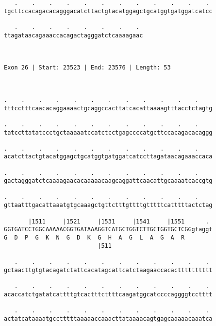 \documentclass{article}
\begin{document}
\begin{Verbatim}
   .    .    .    .    .    .    .    .    .    .    .    . 
tgcttccacagacacagggacatcttactgtacatggagctgcatggtgatggatcatcc
                                                            
   .    .    .    .    .    .    .    . 
ttagataacagaaaccacagactagggatctcaaaagaac
                                        
                                        
 
Exon 26 | Start: 23523 | End: 23576 | Length: 53



.    .    .    .    .    .    .    .    .    .    .    .    
tttcctttcaacacaggaaaactgcaggccacttatcacattaaaagtttacctctagtg
                                                            
.    .    .    .    .    .    .    .    .    .    .    .    
tatccttatatccctgctaaaaatccatctcctgagccccatgcttccacagacacaggg
                                                            
.    .    .    .    .    .    .    .    .    .    .    .    
acatcttactgtacatggagctgcatggtgatggatcatccttagataacagaaaccaca
                                                            
.    .    .    .    .    .    .    .    .    .    .    .    
gactagggatctcaaaagaacacaaaaacaagcaggattcaacattgcaaaatcaccgtg
                                                            
.    .    .    .    .    .    .    .    .    .    .    .    
gttaatttgacattaaatgtgcaaagctgttctttgttttgtttttcatttttactctag
                                                            
       |1511     |1521     |1531     |1541     |1551      . 
GGTGATCCTGGCAAAAACGGTGATAAAGGTCATGCTGGTCTTGCTGGTGCTCGGgtaggt
G  D  P  G  K  N  G  D  K  G  H  A  G  L  A  G  A  R        
                           |511                             
  
   .    .    .    .    .    .    .    .    .    .    .    . 
gctaacttgtgtacagatctattcacatagcattcatctaagaaccacactttttttttt
                                                            
   .    .    .    .    .    .    .    .    .    .    .    . 
acaccatctgatatcattttgtcactttcttttcaagatggcatccccaggggtcctttt
                                                            
   .    .    .    .    .    .    .    .    .    .    .    . 
actatcataaaatgcctttttaaaaaccaaacttataaaacagtgagcaaaaacaaatca
                                                            

\end{Verbatim}
\end{document}
